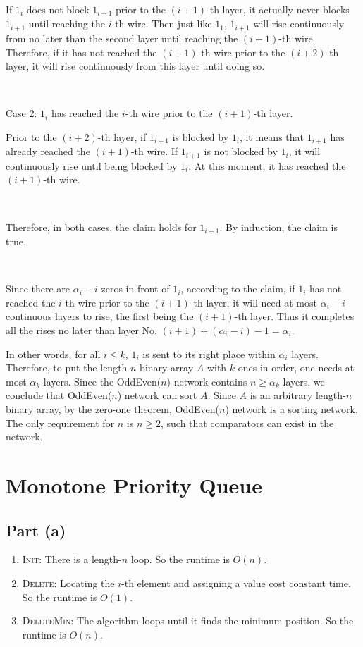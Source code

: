 \documentclass{article}
\begin{document}
If $1_i$ does not block $1_{i+1}$ prior to the $(i+1)$-th layer, it actually never blocks $1_{i+1}$ until reaching the $i$-th wire. Then just like $1_1$, $1_{i+1}$ will rise continuously from no later than the second layer until reaching the $(i+1)$-th wire. Therefore, if it has not reached the $(i+1)$-th wire prior to the $(i+2)$-th layer, it will rise continuously from this layer until doing so.

~

\noindent Case 2: $1_i$ has reached the $i$-th wire prior to the $(i+1)$-th layer.

Prior to the $(i+2)$-th layer, if $1_{i+1}$ is blocked by $1_i$, it means that $1_{i+1}$ has already reached the $(i+1)$-th wire. If $1_{i+1}$ is not blocked by $1_i$, it will continuously rise until being blocked by $1_i$. At this moment, it has reached the $(i+1)$-th wire.

~

Therefore, in both cases, the claim holds for $1_{i+1}$. By induction, the claim is true.


~

Since there are $\alpha_i-i$ zeros in front of $1_i$, according to the claim, if $1_i$ has not reached the $i$-th wire prior to the $(i+1)$-th layer, it will need at most $\alpha_i-i$ continuous layers to rise, the first being the $(i+1)$-th layer. Thus it completes all the rises no later than layer No. $(i+1)+(\alpha_i-i)-1=\alpha_i$.

In other words, for all $i\leqslant k$, $1_i$ is sent to its right place within $\alpha_i$ layers. Therefore, to put the length-$n$ binary array $A$ with $k$ ones in order, one needs at most $\alpha_k$ layers. Since the OddEven($n$) network contains $n\geqslant\alpha_k$ layers, we conclude that OddEven($n$) network can sort $A$. Since $A$ is an arbitrary length-$n$ binary array, by the zero-one theorem, OddEven($n$) network is a sorting network. The only requirement for $n$ is $n\geqslant2$, such that comparators can exist in the network.

\section{Monotone Priority Queue}
\subsection{Part (a)}
\begin{enumerate}
\item\textsc{Init}: There is a length-$n$ loop. So the runtime is $O(n)$.
\item\textsc{Delete}: Locating the $i$-th element and assigning a value cost constant time. So the runtime is $O(1)$.
\item\textsc{DeleteMin}: The algorithm loops until it finds the minimum position. So the runtime is $O(n)$.
\end{enumerate}
\end{document}
